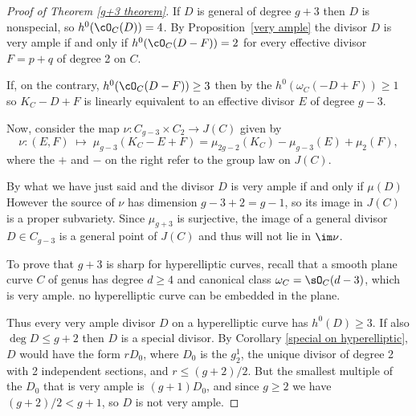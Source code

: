 \begin{proof}[Proof of Theorem \ref{g+3 theorem}]
If 
$D$ is general of degree $g+3$ then $D$ is nonspecial, 
so $h^0(\cO_C(D)) = 4$. By Proposition~\ref{very ample} the divisor
$D$ is very ample if and only if $h^0(\cO_C(D-F)) = 2$
for every effective divisor $F = p+q$ of degree 2 on $C$.

If, on the contrary, $h^0(\cO_C(D-F)) \geq 3$ then by the 
%
$h^0(\omega_C(-D + F)) \geq 1$
so $K_C - D + F$ is  linearly equivalent to 
an effective divisor $E$ of degree $g-3$.

Now, consider the map 
$\nu : C_{g-3} \times C_{2}  \to  J(C)$
given by
$$
\nu : (E,F) \; \mapsto \; \mu_{g-3}(K_C - E + F) = \mu_{2g-2}(K_C) - \mu_{g-3}(E) + \mu_{2}(F), 
$$
where the $+$ and $-$ on the right refer to the group law on $J(C)$. 

By what we have just said and 
%
the divisor $D$ is very ample if and only if
$\mu(D)$ 
However the source of $\nu$ has dimension $g-3+2 = g-1$, so its image
in $J(C)$ is a proper subvariety. Since $\mu_{g+3}$ is surjective, the
image of a general divisor $D \in C_{g-3}$ is a general point of
$J(C)$ and thus will not lie in $\im \nu$.

To prove that $g+3$ is sharp for hyperelliptic curves, recall that a
%
smooth plane curve $C$ of genus 
has degree $d\geq 4$ and canonical class 
$\omega_{C} = \sO_{C}(d-\nobreak 3)$, which is very ample. 
no hyperelliptic curve  can
be embedded in the plane.

Thus every very ample divisor $D$ on a hyperelliptic curve  has $h^0(D) \geq 3$. If also $\deg D \leq g+2$
then $D$ is a special divisor. By Corollary \ref{special on hyperelliptic}, $D$ would have the form
$rD_0$, where $D_0$ is the $g^1_2$, the unique divisor of degree 2 with 2 independent sections,
and $r \leq (g+2)/2$. But the smallest multiple of the $D_0$ that is very ample is $(g+1)D_0$, and
since $g\geq 2$ we have $(g+2)/2 < g+1$, so $D$ is not very ample.
\unif
\end{proof}

